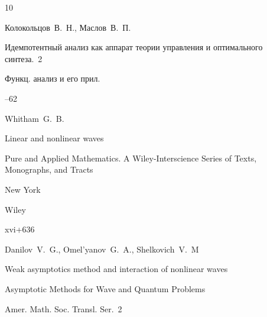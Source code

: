 \begin{thebibliography}{10}

\by Колокольцов~В.~Н., Маслов~В.~П.

\paper Идемпотентный анализ как аппарат теории управления и оптимального синтеза.~2

\jour Функц. анализ и его прил.




--62















\by Whitham~G.~B.

\book Linear and nonlinear waves


\serial Pure and Applied Mathematics. A Wiley-Interscience Series of Texts, Monographs, and Tracts

\publaddr New York

\publ Wiley

\totalpages xvi+636 







\by Danilov~V.~G., Omel'yanov~G.~A., Shelkovich~V.~M

\paper  Weak asymptotics method and interaction of nonlinear waves 

\inbook Asymptotic Methods for Wave and Quantum Problems


\serial Amer. Math. Soc. Transl. Ser.~2


\end{thebibliography}
